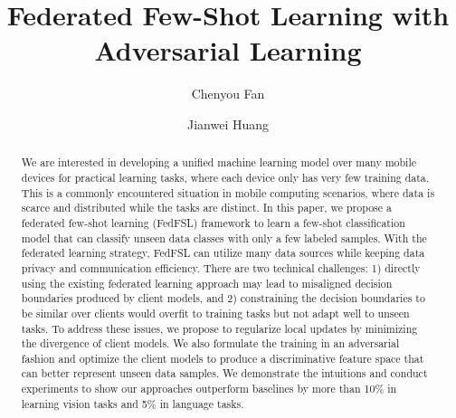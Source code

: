 \documentclass[sigconf]{acmart}
\begin{document}
\title{Federated Few-Shot Learning with Adversarial Learning}

\author{Chenyou Fan}

\author{Jianwei Huang}





\begin{abstract}
We are interested in developing a unified machine learning model over many mobile devices for practical learning tasks, where each device only has very few training data. This is a commonly encountered situation in mobile computing scenarios, where data is scarce and distributed while the tasks are distinct. In this paper, we propose a federated few-shot learning (FedFSL) framework to learn a few-shot classification model that can classify unseen data classes with only a few labeled samples. With the federated learning strategy, FedFSL can utilize many data sources while keeping data privacy and communication efficiency. There are two technical challenges: 1) directly using the existing federated learning approach may lead to misaligned decision boundaries produced by client models, and 2) constraining the decision boundaries to be similar over clients would overfit to training tasks but not adapt well to unseen tasks. To address these issues, we propose to regularize local updates by minimizing the divergence of client models. We also formulate the training in an adversarial fashion and optimize the client models to produce a discriminative feature space that can better represent unseen data samples. We demonstrate the intuitions and conduct experiments to show our approaches outperform baselines by more than 10\% in learning vision tasks and 5\% in language tasks.
\end{abstract}
\end{document}
